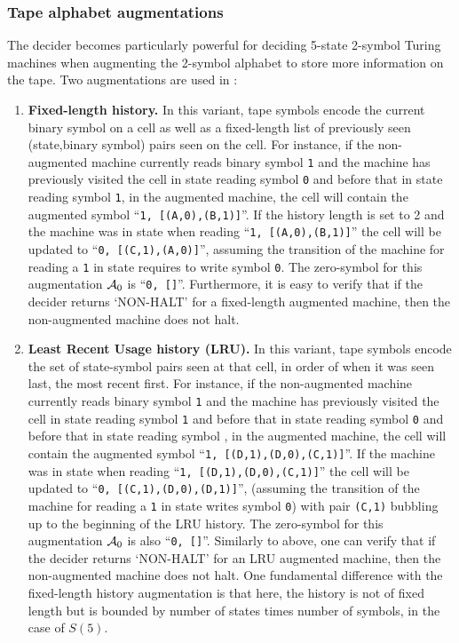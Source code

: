 \subsubsection{Tape alphabet augmentations}\label{sec:n-gramCPS:augmentations}

The \ngramcps decider becomes particularly powerful for deciding 5-state 2-symbol Turing machines when augmenting the 2-symbol alphabet to store more information on the tape. Two augmentations are used in \CoqBB:

\begin{enumerate}
    \item \textbf{Fixed-length history.} In this variant, tape symbols encode the current binary symbol on a cell as well as a fixed-length list of previously seen (state,binary symbol) pairs seen on the cell. For instance, if the non-augmented machine currently reads binary symbol \texttt{1} and the machine has previously visited the cell in state \stateA reading symbol \texttt{0} and before that in state \stateB reading symbol \texttt{1}, in the augmented machine, the cell will contain the augmented symbol ``\texttt{1, [(A,0),(B,1)]}''. If the history length is set to 2 and the machine was in state \stateC when reading ``\texttt{1, [(A,0),(B,1)]}'' the cell will be updated to ``\texttt{0, [(C,1),(A,0)]}'', assuming the transition of the machine for reading a \texttt{1} in state \stateC requires to write symbol \texttt{0}. The zero-symbol for this augmentation $\mathcal{A}_0$ is ``\texttt{0, []}''. Furthermore, it is easy to verify that if the decider returns `NON-HALT' for a fixed-length augmented machine, then the non-augmented machine does not halt.
    \item \textbf{Least Recent Usage history (LRU).} In this variant, tape symbols encode the set of state-symbol pairs seen at that cell,
          in order of when it was seen last, the most recent first.  For instance, if the non-augmented machine currently reads binary symbol \texttt{1} and the machine has previously visited the cell in state \stateD reading symbol \texttt{1} and before that in state \stateD reading symbol \texttt{0} and before that in state \stateC reading symbol \sone, in the augmented machine, the cell will contain the augmented symbol ``\texttt{1, [(D,1),(D,0),(C,1)]}''. If the machine was in state \stateC when reading ``\texttt{1, [(D,1),(D,0),(C,1)]}'' the cell will be updated to ``\texttt{0, [(C,1),(D,0),(D,1)]}'', (assuming the transition of the machine for reading a \texttt{1} in state \stateC writes symbol \texttt{0}) with pair \texttt{(C,1)} bubbling up to the beginning of the LRU history. The zero-symbol for this augmentation $\mathcal{A}_0$ is also ``\texttt{0, []}''. Similarly to above, one can verify that if the decider returns `NON-HALT' for an LRU augmented machine, then the non-augmented machine does not halt. One fundamental difference with the fixed-length history augmentation is that here, the history is not of fixed length but is bounded by number of states times number of symbols,  in the case of $S(5)$.
\end{enumerate}

